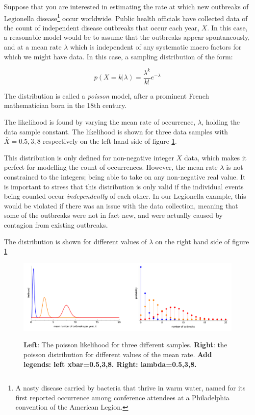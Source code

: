 \documentclass[11pt,fullpage]{book}
\begin{document}
Suppose that you are interested in estimating the rate at which new outbreaks of Legionella disease\footnote{A nasty disease carried by bacteria that thrive in warm water, named for its first reported occurrence among conference attendees at a Philadelphia convention of the American Legion.} occur worldwide. Public health officials have collected data of the count of independent disease outbreaks that occur each year, $X$. In this case, a reasonable model would be to assume that the outbreaks appear spontaneously, and at a mean rate $\lambda$ which is independent of any systematic macro factors for which we might have data. In this case, a sampling distribution of the form:

\begin{equation}
p(X=k|\lambda) = \frac{\lambda^k}{k!} e^{-\lambda}
\end{equation}

The distribution is called a \textit{poisson} model, after a prominent French mathematician born in the 18th century.

The likelihood is found by varying the mean rate of occurrence, $\lambda$, holding the data sample constant. The likelihood is shown for three data samples with $\bar{X}=0.5,3,8$ respectively on the left hand side of figure \ref{fig:Distributions_poissonLegionella}. 

This distribution is only defined for non-negative integer $X$ data, which makes it perfect for modelling the count of occurrences. However, the mean rate $\lambda$ is not constrained to the integers; being able to take on any non-negative real value. It is important to stress that this distribution is only valid if the individual events being counted occur \textit{independently} of each other. In our Legionella example, this would be violated if there was an issue with the data collection, meaning that some of the outbreaks were not in fact new, and were actually caused by contagion from existing outbreaks. 

The distribution is shown for different values of $\lambda$ on the right hand side of figure \ref{fig:Distributions_poissonLegionella}

\begin{figure}
\centering
\scalebox{0.5} 
{\includegraphics{Distributions_poissonLegionella.pdf}}
\caption{\textbf{Left}: The poisson likelihood for three different samples. \textbf{Right}: the poisson distribution for different values of the mean rate. \textbf{Add legends: left xbar=0.5,3,8. Right: lambda=0.5,3,8.}}\label{fig:Distributions_poissonLegionella}
\end{figure}
\end{document}
